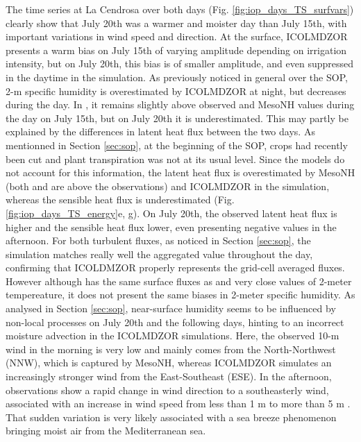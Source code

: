 The time series at La Cendrosa over both days (Fig. \ref{fig:iop_days_TS_surfvars}) clearly show that July 20th was a warmer and moister day than July 15th, with important variations in wind speed and direction.
At the surface, ICOLMDZOR presents a warm bias on July 15th of varying amplitude depending on irrigation intensity, but on July 20th, this bias is of smaller amplitude, and even suppressed in the daytime in the \irrboost simulation.
As previously noticed in general over the SOP, 2-m specific humidity is overestimated by ICOLMDZOR at night, but decreases during the day. In \irrboost, it remains slightly above observed and MesoNH values during the day on July 15th, but on July 20th it is underestimated.
This may partly be explained by the differences in latent heat flux between the two days. As mentionned in Section \ref{sec:sop}, at the beginning of the SOP, crops had recently been cut and plant transpiration was not at its usual level.
Since the models do not account for this information, the latent heat flux is overestimated by MesoNH (both \mesoexact and \mesomean are above the observations) and ICOLMDZOR in the \irrboost simulation, whereas the sensible heat flux is underestimated (Fig. \ref{fig:iop_days_TS_energy}e, g). 
On July 20th, the observed latent heat flux is higher and the sensible heat flux lower, even presenting negative values in the afternoon.
For both turbulent fluxes, as noticed in Section \ref{sec:sop}, the \irrboost simulation matches really well the \mesomean aggregated value throughout the day, confirming that ICOLDMZOR properly represents the grid-cell averaged fluxes.
However although \mesomean has the same surface fluxes as \irrboost and very close values of 2-meter tempereature, it does not present the same biases in 2-meter specific humidity. As analysed in Section \ref{sec:sop}, near-surface humidity seems to be influenced by non-local processes on July 20th and the following days, hinting to an incorrect moisture advection in the ICOLMDZOR simulations. 
Here, the observed 10-m wind in the morning is very low and mainly comes from the North-Northwest (NNW), which is captured by MesoNH, whereas ICOLMDZOR simulates an increasingly stronger wind from the East-Southeast (ESE). 
In the afternoon, observations show a rapid change in wind direction to a southeasterly wind, associated with an increase in wind speed from less than 1 m \persec to more than 5 m \persec. That sudden variation is very likely associated with a sea breeze phenomenon bringing moist air from the Mediterranean sea. %

